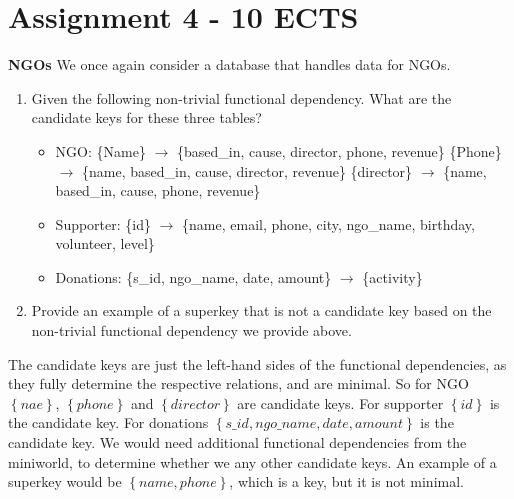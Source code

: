 \documentclass[working, oneside]{../../Preambles/tuftebook}
\begin{document}
\let\cleardoublepage\clearpage
\thispagestyle{fancy}
\chapter{Assignment 4 - 10 ECTS}
    
\begin{exercise}[1]
\textbf{NGOs}
    We once again consider a database that handles data for NGOs.
    \begin{enumerate}
        \item Given the following non-trivial functional dependency. What are the candidate keys for these three tables?
        \begin{itemize}
            \item NGO: \{Name\} $\rightarrow$ \{based\_in, cause, director, phone, revenue\}
            \{Phone\} $\rightarrow$ \{name, based\_in, cause, director, revenue\}
            \{director\} $\rightarrow$ \{name, based\_in, cause, phone, revenue\}
            \item Supporter: \{id\} $\rightarrow$ \{name, email, phone, city, ngo\_name, birthday, volunteer, level\}
            \item Donations: \{s\_id, ngo\_name, date, amount\} $\rightarrow$ \{activity\}
        \end{itemize}
        \item Provide an example of a superkey that is not a candidate key based on the non-trivial functional dependency we provide above.
\end{enumerate}
\end{exercise}
\begin{solution}
    The candidate keys are just the left-hand sides of the functional dependencies, as they fully determine the respective relations, and are minimal. So for NGO $\left\{ nae \right\} $, $\left\{ phone \right\} $ and $\left\{ director \right\} $ are candidate keys. For supporter $\left\{ id \right\} $ is the candidate key. For donations $\left\{ s\_id, ngo\_name, date, amount \right\} $ is the candidate key. We would need additional functional dependencies from the miniworld, to determine whether we any other candidate keys. An example of a superkey would be $\left\{ name, phone \right\}$, which is a key, but it is not minimal.
\end{solution}
\end{document}
